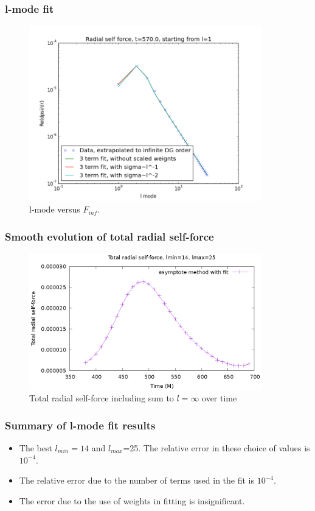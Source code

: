 \documentclass{beamer}
\begin{document}
\begin{frame}
  \frametitle{l-mode fit}
  \begin{figure}
    \includegraphics[width=0.9\textwidth]{fiterrscalecorrect3term570l1}
    \caption{l-mode versus $F_{inf}$.}
  \end{figure}
\end{frame}

\begin{frame}
  \frametitle{Smooth evolution of total radial self-force}
  \begin{figure}
    \includegraphics[width=0.9\textwidth]{totalselfforcevt2}
     \caption{Total radial self-force including sum to $l=\infty$ over time}
  \end{figure}
\end{frame}


\begin{frame}
  \frametitle{Summary of l-mode fit results}
  \begin{itemize}
  \item The best $l_{min}=14$ and $l_{max}$=25. The relative error in these choice of values is $10^{-4}$.
  \item The relative error due to the number of terms used in the fit is $10^{-4}$.
  \item The error due to the use of weights in fitting is insignificant.
  \end{itemize}
\end{frame}
\end{document}

